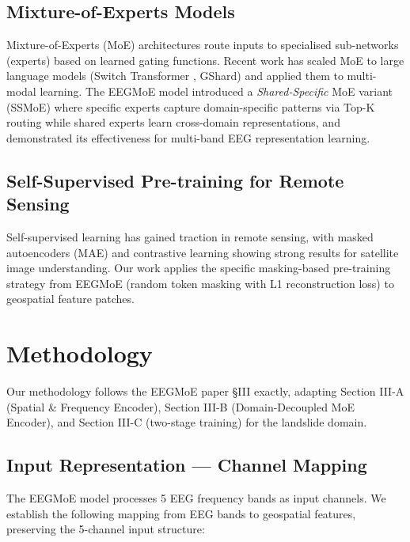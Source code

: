 \documentclass[conference]{IEEEtran}
\begin{document}
\subsection{Mixture-of-Experts Models}
Mixture-of-Experts (MoE) architectures \cite{moe_original} route inputs to specialised sub-networks (experts) based on learned gating functions. Recent work has scaled MoE to large language models (Switch Transformer \cite{switch_transformer}, GShard) and applied them to multi-modal learning. The EEGMoE model \cite{eegmoe2026} introduced a \textit{Shared-Specific} MoE variant (SSMoE) where specific experts capture domain-specific patterns via Top-K routing while shared experts learn cross-domain representations, and demonstrated its effectiveness for multi-band EEG representation learning.

\subsection{Self-Supervised Pre-training for Remote Sensing}
Self-supervised learning has gained traction in remote sensing, with masked autoencoders (MAE) \cite{mae} and contrastive learning showing strong results for satellite image understanding. Our work applies the specific masking-based pre-training strategy from EEGMoE (random token masking with L1 reconstruction loss) to geospatial feature patches.

\section{Methodology}

Our methodology follows the EEGMoE paper \cite{eegmoe2026} \S III exactly, adapting Section III-A (Spatial \& Frequency Encoder), Section III-B (Domain-Decoupled MoE Encoder), and Section III-C (two-stage training) for the landslide domain.

\subsection{Input Representation — Channel Mapping}

The EEGMoE model processes 5 EEG frequency bands as input channels. We establish the following mapping from EEG bands to geospatial features, preserving the 5-channel input structure:
\end{document}
